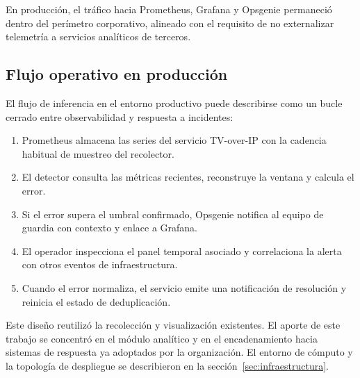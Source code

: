En producción, el tráfico hacia Prometheus, Grafana y Opsgenie permaneció dentro del perímetro corporativo, alineado con el requisito de no externalizar telemetría a servicios analíticos de terceros.

\subsection{Flujo operativo en producción}

El flujo de inferencia en el entorno productivo puede describirse como un bucle cerrado entre observabilidad y respuesta a incidentes:

\begin{enumerate}
\item Prometheus almacena las series del servicio TV-over-IP con la cadencia habitual de muestreo del recolector.
\item El detector consulta las métricas recientes, reconstruye la ventana y calcula el error.
\item Si el error supera el umbral confirmado, Opsgenie notifica al equipo de guardia con contexto y enlace a Grafana.
\item El operador inspecciona el panel temporal asociado y correlaciona la alerta con otros eventos de infraestructura.
\item Cuando el error normaliza, el servicio emite una notificación de resolución y reinicia el estado de deduplicación.
\end{enumerate}

Este diseño reutilizó la recolección y visualización existentes. El aporte de este trabajo se concentró en el módulo analítico y en el encadenamiento hacia sistemas de respuesta ya adoptados por la organización. El entorno de cómputo y la topología de despliegue se describieron en la sección~\ref{sec:infraestructura}.

\endgroup
